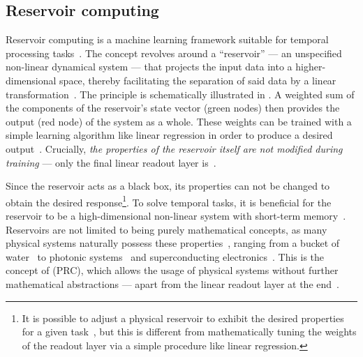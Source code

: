 \subsection{Reservoir computing}
Reservoir computing is a machine learning framework suitable for temporal processing tasks~\cite{BookReservoirComputing}.
The concept revolves around a ``reservoir'' --- an unspecified non-linear dynamical system --- that projects the input data into a higher-dimensional space, thereby facilitating the separation of said data by a linear transformation~\cite{appeltant2011information,KUR-24,RC_ASI}. %
The principle is schematically illustrated in .
A weighted sum of the components of the reservoir's state vector (green nodes) then provides the output (red node) of the system as a whole. %
These weights can be trained with a simple learning algorithm like linear regression in order to produce a desired output~\cite{RC_RecentAdvances, RC_SuperconductingElectronics}.
Crucially, \textit{the properties of the reservoir itself are not modified during training} --- only the final linear readout layer is~\cite{RC_ASI,DynamicEmergence_NanomagneticSystem}. \par
Since the reservoir acts as a black box, its properties can not be changed to obtain the desired response\footnote{
	It is possible to adjust a physical reservoir to exhibit the desired properties for a given task~\cite{AdaptiveProgrammableRC,gartside2022reconfigurable}, but this is different from mathematically tuning the weights of the readout layer via a simple procedure like linear regression.
}.
To solve temporal tasks, it is beneficial for the reservoir to be a high-dimensional non-linear system with short-term memory~\cite{NeuromorphicAFMspintronics,RC_RecentAdvances}.
Reservoirs are not limited to being purely mathematical concepts, as many physical systems naturally possess these properties~\cite{RC_DipoleNanomagnets,RC_PassiveFrustratedNM,RC_ASI,RC_RecentAdvances,NeuromorphicOscillators,VowelRecognition4STO,RC_DiffusiveMemristors,RC_MemristorTemporal,gartside2022reconfigurable}, ranging from a bucket of water~\cite{PatternRecognition_Bucket} to photonic systems~\cite{RC_Photonic} and superconducting electronics~\cite{RC_SuperconductingElectronics}.
This is the concept of  (PRC), which allows the usage of physical systems without further mathematical abstractions --- apart from the linear readout layer at the end~\cite{RC_RecentAdvances}. \par
